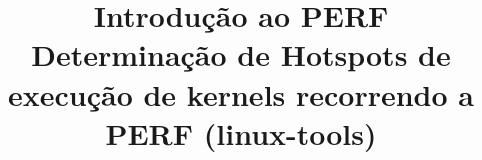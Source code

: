 \documentclass[conference,compsoc]{IEEEtran}
\begin{document}
%
  \title{Introdução ao PERF\\ Determinação de Hotspots de execução de kernels recorrendo a PERF (linux-tools)}

  \author{
  }


% 




\end{document}
